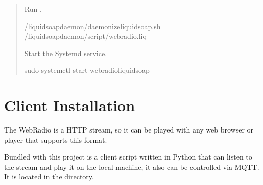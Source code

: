 \documentclass[letterpaper,10pt,english]{sphinxmanual}
\begin{document}
\begin{enumerate}
\begin{quote}
\sphinxAtStartPar
Run .

\begin{sphinxVerbatim}[commandchars=\\\{\}]
\PYGZti{}/liquidsoap\PYGZhy{}daemon/daemonize\PYGZhy{}liquidsoap.sh \PYGZti{}/liquidsoap\PYGZhy{}daemon/script/webradio.liq
\end{sphinxVerbatim}

\sphinxAtStartPar
Start the Systemd service.

\begin{sphinxVerbatim}[commandchars=\\\{\}]
sudo systemctl start webradio\PYGZhy{}liquidsoap
\end{sphinxVerbatim}
\end{quote}

\end{enumerate}

\sphinxstepscope


\chapter{Client Installation}
\label{\detokenize{client_install:client-installation}}\label{\detokenize{client_install::doc}}
\sphinxAtStartPar
The WebRadio is a HTTP stream, so it can be played with any web browser or player that supports this format.

\sphinxAtStartPar
Bundled with this project is a client script written in Python that can listen to the stream and play it on the
local machine, it also can be controlled via MQTT. It is located in the  directory.
\end{document}
